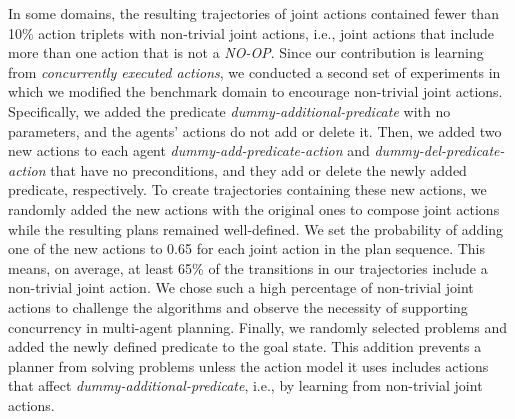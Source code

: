 \documentclass[letterpaper]{article} %
\theoremstyle{definition}
\theoremstyle{remark}
\newcommand{\noop}{\textit{NO-OP}\xspace}
\newcommand{\roni}[1]{{\textcolor{red}{[Roni: #1]}}}
\begin{document}
In some domains, the resulting trajectories of joint actions contained fewer than 10\% action triplets with non-trivial joint actions, i.e., joint actions that include more than one action that is not a \noop.
Since our contribution is learning from \emph{concurrently executed actions}, we conducted a second set of experiments in which we modified the benchmark domain to encourage non-trivial joint actions. Specifically,
we added the predicate \textit{dummy-additional-predicate} with no parameters, and the agents' actions do not add or delete it.
Then, we added two new actions to each agent \textit{dummy-add-predicate-action} and \textit{dummy-del-predicate-action} that have no preconditions, and they add or delete the newly added predicate, respectively.
To create trajectories containing these new actions, we randomly added the new actions with the original ones to compose joint actions while the resulting plans remained well-defined.
We set the probability of adding one of the new actions to 0.65 for each joint action in the plan sequence.
This means, on average, at least 65\% of the transitions in our trajectories include a non-trivial joint action. %
We chose such a high percentage of non-trivial joint actions to challenge the algorithms and observe the necessity of supporting concurrency in multi-agent planning. %
Finally, we randomly selected problems and added the newly defined predicate to the goal state.
This addition prevents a planner from solving problems unless the action model it uses includes actions that affect \textit{dummy-additional-predicate}, i.e., by learning from non-trivial joint actions.
\end{document}
